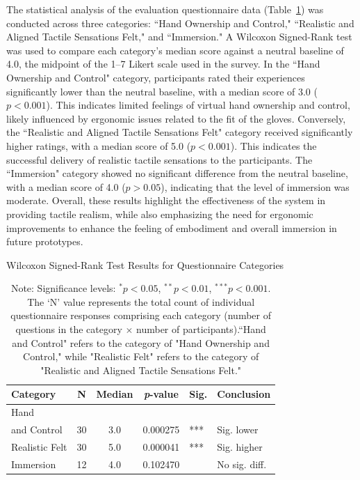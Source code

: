 \documentclass[a4paper,twocolumn]{article}
\begin{document}
The statistical analysis of the evaluation questionnaire data (Table~\ref{tab:wilcoxon_category_results}) was conducted across three categories: ``Hand Ownership and Control," ``Realistic and Aligned Tactile Sensations Felt," and ``Immersion." A Wilcoxon Signed-Rank test was used to compare each category’s median score against a neutral baseline of 4.0, the midpoint of the 1–7 Likert scale used in the survey.
In the ``Hand Ownership and Control" category, participants rated their experiences significantly lower than the neutral baseline, with a median score of 3.0 ($p<0.001$). This indicates limited feelings of virtual hand ownership and control, likely influenced by ergonomic issues related to the fit of the gloves.
Conversely, the ``Realistic and Aligned Tactile Sensations Felt" category received significantly higher ratings, with a median score of 5.0 ($p<0.001$). This indicates the successful delivery of realistic tactile sensations to the participants.
The ``Immersion" category showed no significant difference from the neutral baseline, with a median score of 4.0 ($p>0.05$), indicating that the level of immersion was moderate.
Overall, these results highlight the effectiveness of the system in providing tactile realism, while also emphasizing the need for ergonomic improvements to enhance the feeling of embodiment and overall immersion in future prototypes.
\begin{table}[H]
  \small
    \centering
    \caption{Wilcoxon Signed-Rank Test Results for Questionnaire Categories}
    \label{tab:wilcoxon_category_results}
    \begin{tabular}{@{} p{1.5cm} c c c l p{1.5cm} @{}}
        \toprule
        \textbf{Category} & \textbf{N} & \textbf{Median} & \textbf{\textit{p}-value} & \textbf{Sig.} & \textbf{Conclusion} \\
        \midrule
        Hand \\ and Control & 30 & 3.0 & 0.000275 & *** & Sig. lower\\ %
        \midrule
        Realistic Felt & 30 & 5.0 & 0.000041 & *** & Sig. higher\\ %
        \midrule
        Immersion & 12 & 4.0 & 0.102470 & & No sig. diff. \\
        \bottomrule
    \end{tabular}
    \caption*{Note: Significance levels: $^* p < 0.05$, $^{**} p < 0.01$, $^{***} p < 0.001$. The `N' value represents the total count of individual questionnaire responses comprising each category (number of questions in the category $\times$ number of participants).``Hand and Control" refers to the category of "Hand Ownership and Control," while "Realistic Felt" refers to the category of "Realistic and Aligned Tactile Sensations Felt." }
\end{table}
\end{document}
